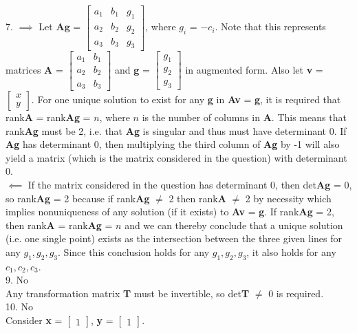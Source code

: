 \documentclass{article}
\begin{document}
    7. $\implies$ Let $\textbf{A} \textbf{g}$ = $\begin{bmatrix} a_1 & b_1 & g_1\\a_2 & b_2 & g_2\\a_3 & b_3 & g_3\end{bmatrix}$, where $g_i$ = $-c_i$. Note that this represents matrices \textbf{A} = $\begin{bmatrix} a_1 & b_1\\a_2 & b_2\\a_3 & b_3\end{bmatrix}$ and \textbf{g} = $\begin{bmatrix} g_1\\g_2\\g_3\end{bmatrix}$ in augmented form. Also let \textbf{v} = $\begin{bmatrix} x\\y\end{bmatrix}$. For one unique solution to exist for any \textbf{g} in \textbf{Av} = \textbf{g}, it is required that rank\textbf{A} = rank\textbf{Ag} = $n$, where $n$ is the number of columns in \textbf{A}. This means that rank\textbf{Ag} must be 2, i.e. that \textbf{Ag} is singular and thus must have determinant 0. If \textbf{Ag} has determinant 0, then multiplying the third column of \textbf{Ag} by -1 will also yield a matrix (which is the matrix considered in the question) with determinant 0.\\
  $\impliedby$ If the matrix considered in the question has determinant 0, then det\textbf{Ag} = 0, so rank\textbf{Ag} = 2 because if rank\textbf{Ag} $\neq$ 2 then rank\textbf{A} $\neq$ 2 by necessity which implies nonuniqueness of any solution (if it exists) to \textbf{Av} = \textbf{g}. If rank\textbf{Ag} = 2, then rank\textbf{A} = rank\textbf{Ag} = $n$ and we can thereby conclude that a unique solution (i.e. one single point) exists as the intersection between the three given lines for any $g_1, g_2, g_3$. Since this conclusion holds for any $g_1, g_2, g_3$, it also holds for any $c_1, c_2, c_3$.\\

    9. No\\
    Any transformation matrix \textbf{T} must be invertible, so det\textbf{T} $\neq$ 0 is required. \\

    10. No\\
    Consider \textbf{x} = $\begin{bmatrix} 1\end{bmatrix}$, \textbf{y} = $\begin{bmatrix} 1\end{bmatrix}$.\\
\end{document}
